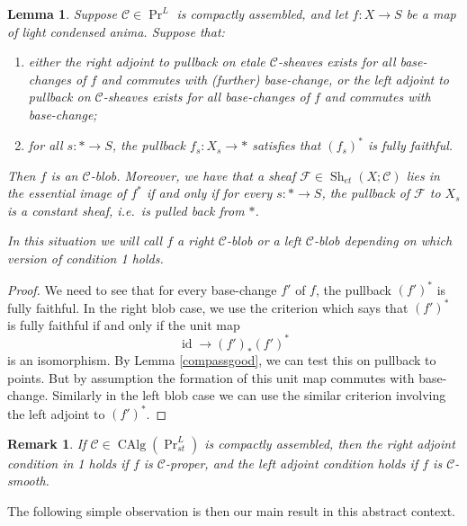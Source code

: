 \documentclass[12pt]{article}
\newtheorem{lemma}[theorem]{Lemma}
\newtheorem{remark}[theorem]{Remark}
\newcommand{\on}{\operatorname}
\newcommand{\mc}{\mathcal}
\begin{document}
\begin{lemma}\label{blob}
Suppose $\mathcal{C}\in\on{Pr}^L$ is compactly assembled, and let $f:X\to S$ be a map of light condensed anima.  Suppose that:
\begin{enumerate}
\item either the right adjoint to pullback on etale $\mc{C}$-sheaves exists for all base-changes of $f$ and commutes with (further) base-change, or the left adjoint to pullback on $\mc{C}$-sheaves exists for all base-changes of $f$ and commutes with base-change;
\item for all $s:\ast \to S$, the pullback $f_s:X_s\to \ast$ satisfies that $(f_s)^\ast$ is fully faithful.
\end{enumerate}
Then $f$ is an $\mc{C}$-blob.  Moreover, we have that a sheaf $\mathcal{F}\in \on{Sh}_{et}(X;\mc{C})$ lies in the essential image of $f^\ast$ if and only if for every $s:\ast \to S$, the pullback of $\mc{F}$ to $X_s$ is a constant sheaf, i.e.\ is pulled back from $\ast$.

In this situation we will call $f$ a \emph{right $\mathcal{C}$-blob} or a \emph{left $\mc{C}$-blob} depending on which version of condition 1 holds.
\end{lemma}
\begin{proof}
We need to see that for every base-change $f'$ of $f$, the pullback $(f')^\ast$ is fully faithful.  In the right blob case, we use the criterion which says that $(f')^\ast$ is fully faithful if and only if the unit map
$$\on{id}\rightarrow (f')_\ast (f')^\ast$$
is an isomorphism.  By Lemma \ref{compassgood}, we can test this on pullback to points.  But by assumption the formation of this unit map commutes with base-change.  Similarly in the left blob case we can use the similar criterion involving the left adjoint to $(f')^\ast$.
\end{proof}
\begin{remark}\label{propersmoothblob}
If $\mathcal{C}\in\on{CAlg}(\on{Pr}_{st}^L)$ is compactly assembled, then the right adjoint condition in 1 holds if $f$ is $\mc{C}$-proper, and the left adjoint condition holds if $f$ is $\mc{C}$-smooth.
\end{remark}

The following simple observation is then our main result in this abstract context.
\end{document}
